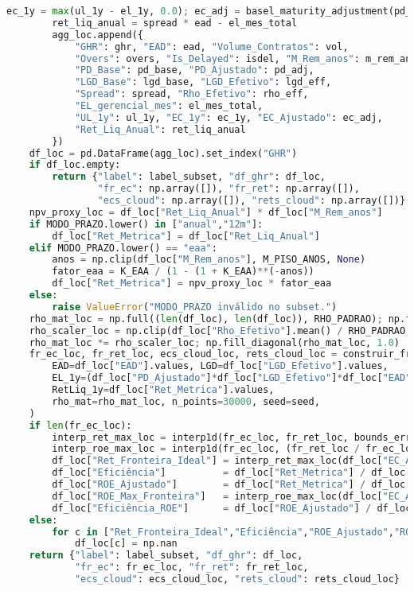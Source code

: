 \documentclass[11pt,a4paper]{article}
\newcommand{\1}{\mathbf{1}}
\begin{document}
\begin{lstlisting}[language=Python, caption={risk_frontier.py}]
        ec_1y = max(ul_1y - el_1y, 0.0); ec_adj = basel_maturity_adjustment(pd_adj, ec_1y, m_rem_anos)
        ret_liq_anual = spread * ead - el_mes_total
        agg_loc.append({
            "GHR": ghr, "EAD": ead, "Volume_Contratos": vol,
            "Overs": overs, "Is_Delayed": isdel, "M_Rem_anos": m_rem_anos,
            "PD_Base": pd_base, "PD_Ajustado": pd_adj,
            "LGD_Base": lgd_base, "LGD_Efetivo": lgd_eff,
            "Spread": spread, "Rho_Efetivo": rho_eff,
            "EL_gerencial_mes": el_mes_total,
            "UL_1y": ul_1y, "EC_1y": ec_1y, "EC_Ajustado": ec_adj,
            "Ret_Liq_Anual": ret_liq_anual
        })
    df_loc = pd.DataFrame(agg_loc).set_index("GHR")
    if df_loc.empty:
        return {"label": label_subset, "df_ghr": df_loc,
                "fr_ec": np.array([]), "fr_ret": np.array([]),
                "ecs_cloud": np.array([]), "rets_cloud": np.array([])}
    npv_proxy_loc = df_loc["Ret_Liq_Anual"] * df_loc["M_Rem_anos"]
    if MODO_PRAZO.lower() in ["anual","12m"]:
        df_loc["Ret_Metrica"] = df_loc["Ret_Liq_Anual"]
    elif MODO_PRAZO.lower() == "eaa":
        anos = np.clip(df_loc["M_Rem_anos"], M_PISO_ANOS, None)
        fator_eaa = K_EAA / (1 - (1 + K_EAA)**(-anos))
        df_loc["Ret_Metrica"] = npv_proxy_loc * fator_eaa
    else:
        raise ValueError("MODO_PRAZO inválido no subset.")
    rho_mat_loc = np.full((len(df_loc), len(df_loc)), RHO_PADRAO); np.fill_diagonal(rho_mat_loc, 1.0)
    rho_scaler_loc = np.clip(df_loc["Rho_Efetivo"].mean() / RHO_PADRAO, 0.8, 1.5)
    rho_mat_loc *= rho_scaler_loc; np.fill_diagonal(rho_mat_loc, 1.0)
    fr_ec_loc, fr_ret_loc, ecs_cloud_loc, rets_cloud_loc = construir_fronteira(
        EAD=df_loc["EAD"].values, LGD=df_loc["LGD_Efetivo"].values,
        EL_1y=(df_loc["PD_Ajustado"]*df_loc["LGD_Efetivo"]*df_loc["EAD"]).values,
        RetLiq_1y=df_loc["Ret_Metrica"].values,
        rho_mat=rho_mat_loc, n_points=30000, seed=seed,
    )
    if len(fr_ec_loc):
        interp_ret_max_loc = interp1d(fr_ec_loc, fr_ret_loc, bounds_error=False, fill_value="extrapolate")
        interp_roe_max_loc = interp1d(fr_ec_loc, (fr_ret_loc / fr_ec_loc), bounds_error=False, fill_value="extrapolate")
        df_loc["Ret_Fronteira_Ideal"] = interp_ret_max_loc(df_loc["EC_Ajustado"].values)
        df_loc["Eficiência"]          = df_loc["Ret_Metrica"] / df_loc["Ret_Fronteira_Ideal"]
        df_loc["ROE_Ajustado"]        = df_loc["Ret_Metrica"] / df_loc["EC_Ajustado"].replace(0, np.nan)
        df_loc["ROE_Max_Fronteira"]   = interp_roe_max_loc(df_loc["EC_Ajustado"].values)
        df_loc["Eficiência_ROE"]      = df_loc["ROE_Ajustado"] / df_loc["ROE_Max_Fronteira"]
    else:
        for c in ["Ret_Fronteira_Ideal","Eficiência","ROE_Ajustado","ROE_Max_Fronteira","Eficiência_ROE"]:
            df_loc[c] = np.nan
    return {"label": label_subset, "df_ghr": df_loc,
            "fr_ec": fr_ec_loc, "fr_ret": fr_ret_loc,
            "ecs_cloud": ecs_cloud_loc, "rets_cloud": rets_cloud_loc}


\end{lstlisting}
\end{document}
